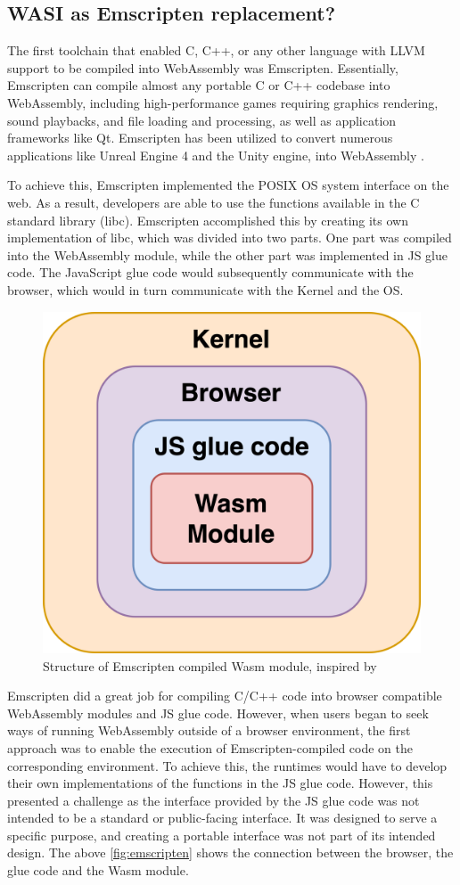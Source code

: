 \subsection{WASI as Emscripten replacement?}
The first toolchain that enabled C, C++, or any other language with \gls{LLVM} support to be compiled into WebAssembly was Emscripten. Essentially, Emscripten can compile almost any portable C or C++ codebase into WebAssembly, including high-performance games requiring graphics rendering, sound playbacks, and file loading and processing, as well as application frameworks like Qt. Emscripten has been utilized to convert numerous applications like Unreal Engine 4 and the Unity engine, into WebAssembly \cite{emscriptencommunity_2023_emscripten}. 

To achieve this, Emscripten implemented the \gls{POSIX} OS system interface on the web. 
As a result, developers are able to use the functions available in the C standard library (\gls{libc}). 
Emscripten accomplished this by creating its own implementation of libc, which was divided into two parts. One part was compiled into the WebAssembly module, while the other part was implemented in \gls{JS glue code}. 
The JavaScript glue code would subsequently communicate with the browser, which would in turn communicate with the Kernel and the OS.

\begin{figure}[H]
    \centering
        \includegraphics[width=0.6\linewidth]{images/wasm/Emscripten.png}
    \caption{Structure of Emscripten compiled Wasm module, inspired by \cite{clark_2019_standardising}}
    \label{fig:emscripten}
\end{figure}

Emscripten did a great job for compiling C/C++ code into browser compatible \gls{WebAssembly} modules and \gls{JS glue code}. However, when users began to seek ways of running \hbox{WebAssembly} outside of a browser environment, the first approach was to enable the execution of Emscripten-compiled code on the corresponding environment. To achieve this, the runtimes would have to develop their own implementations of the functions in the JS glue code. However, this presented a challenge as the interface provided by the \gls{JS glue code} was not intended to be a standard or public-facing interface. 
It was designed to serve a specific purpose, and creating a portable interface was not part of its intended design. The above \autoref{fig:emscripten} shows the connection between the browser, the glue code and the Wasm module. 

